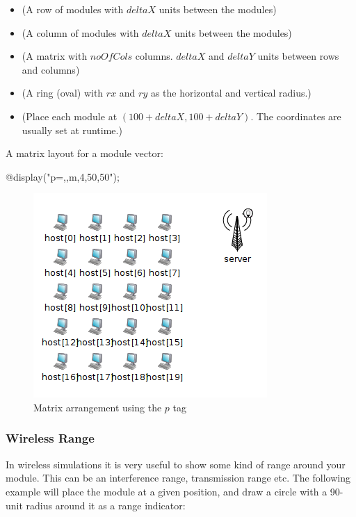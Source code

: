 \begin{itemize}
  \item {} (A row of modules with $deltaX$ units between the modules)
  \item {} (A column of modules with $deltaX$ units between the modules)
  \item {} (A matrix with $noOfCols$ columns.
            $deltaX$ and $deltaY$ units between rows and columns)
  \item {} (A ring (oval) with $rx$ and $ry$ as the horizontal and vertical radius.)
  \item {} (Place each module at $(100+deltaX, 100+deltaY)$.
            The coordinates are usually set at runtime.)
\end{itemize}

A matrix layout for a module vector:

\begin{ned}
@display("p=,,m,4,50,50");
\end{ned}

\begin{figure}[htbp]
  \begin{center}
    \includegraphics{figures/graphics-ptag}
    \caption{Matrix arrangement using the $p$ tag}
    \label{fig:graphics-ptag}
  \end{center}
\end{figure}

\subsubsection{Wireless Range}
In wireless simulations it is very useful to show some kind of range
around your module. This can be an interference range, transmission range
etc. The following example will place the module at a given position,
and draw a circle with a 90-unit radius around it as a range indicator:


